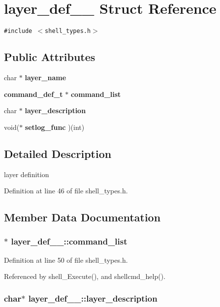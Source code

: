 \section{layer\_\-def\_\-\_\- Struct Reference}
\label{structlayer__def____}
{\tt \#include $<$shell\_\-types.h$>$}

\subsection*{Public Attributes}
\begin{CompactItemize}
\item 
char $\ast$ {\bf layer\_\-name}
\item 
{\bf command\_\-def\_\-t} $\ast$ {\bf command\_\-list}
\item 
char $\ast$ {\bf layer\_\-description}
\item 
void($\ast$ {\bf setlog\_\-func} )(int)
\end{CompactItemize}


\subsection{Detailed Description}
layer definition 



Definition at line 46 of file shell\_\-types.h.

\subsection{Member Data Documentation}
\subsubsection{$\ast$ {\bf layer\_\-def\_\-\_\-::command\_\-list}}\label{structlayer__def_____o1}




Definition at line 50 of file shell\_\-types.h.

Referenced by shell\_\-Execute(), and shellcmd\_\-help().
\subsubsection{\setlength{\rightskip}{0pt plus 5cm}char$\ast$ {\bf layer\_\-def\_\-\_\-::layer\_\-description}}\label{structlayer__def_____o2}




